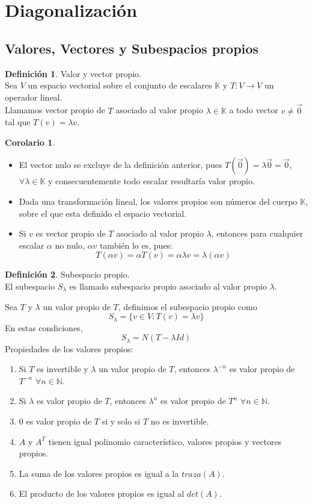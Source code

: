 \documentclass[10pt]{article}
\theoremstyle{definition}
\newtheorem{definition}{Definición}[section]
\newtheorem{corollary}{Corolario}[theorem]
\begin{document}
\section{Diagonalización}
\subsection{Valores, Vectores y Subespacios propios}
\begin{definition}{Valor y vector propio.}
	\\Sea $V$ un espacio vectorial sobre el conjunto de escalares $\mathbb{K}$ y $T:V\to V$ un operador lineal.\\
	Llamamos vector propio de $T$ asociado al valor propio $\lambda\in\mathbb{K}$ a todo vector $v\neq \vec{0}$ tal que $T(v)=\lambda v$.
\end{definition}
\begin{corollary}
	\hfill
	\begin{itemize}
		\item El vector nulo se excluye de la definición anterior, pues $T(\vec{0})=\lambda\vec{0}=\vec{0}$, $\forall\lambda\in\mathbb{K}$ y consecuentemente todo escalar resultaría valor propio.
		\item Dada una transformación lineal, los valores propios son números del cuerpo $\mathbb{K}$, sobre el que esta definido el espacio vectorial.
		\item Si $v$ es vector propio de $T$ asociado al valor propio $\lambda$, entonces para cualquier escalar $\alpha$ no nulo, $\alpha v$ también lo es, pues: $$T\left( \alpha v \right) = \alpha T(v)=\alpha\lambda v=\lambda(\alpha v)$$
	\end{itemize}
\end{corollary}
\begin{definition}{Subespacio propio.}
	\\El subespacio $S_{\lambda}$ es llamado subespacio propio asociado al valor propio $\lambda$.
\end{definition}
Sea $T$ y $\lambda$ un valor propio de $T$, definimos el subespacio propio como $$S_{\lambda}=\{v\in V : T(v)=\lambda v\}$$
En estas condiciones, $$S_{\lambda}=N(T-\lambda Id)$$
\newpage
Propiedades de los valores propios:
\begin{enumerate}
	\item Si $T$ es invertible y $\lambda$ un valor propio de $T$, entonces $\lambda ^{-n}$ es valor propio de $T^{-n}$ $\forall n\in\mathbb{N}$.
	\item Si $\lambda$ es valor propio de $T$, entonces $\lambda ^n$ es valor propio de $T^n$ $\forall n\in\mathbb{N}$.
	\item $0$ es valor propio de $T$ si y solo si $T$ no es invertible.
	\item $A$ y $A^T$ tienen igual polinomio característico, valores propios y vectores propios.
	\item La suma de los valores propios es igual a la $traza(A)$.
	\item El producto de los valores propios es igual al $det(A)$.
\end{enumerate}
\end{document}
